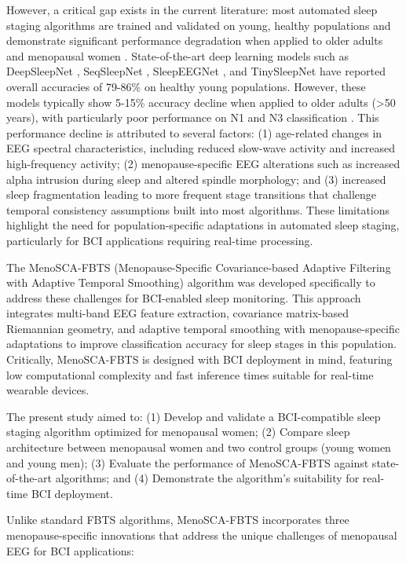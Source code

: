 \documentclass[a4paper,fleqn]{cas-dc}
\begin{document}
However, a critical gap exists in the current literature: most automated sleep staging algorithms are trained and validated on young, healthy populations and demonstrate significant performance degradation when applied to older adults and menopausal women \cite{Phan2021}. State-of-the-art deep learning models such as DeepSleepNet \cite{Supratak2017}, SeqSleepNet \cite{Phan2019}, SleepEEGNet \cite{Supratak2018}, and TinySleepNet \cite{Perslev2021} have reported overall accuracies of 79-86\% on healthy young populations. However, these models typically show 5-15\% accuracy decline when applied to older adults (\textgreater{}50 years), with particularly poor performance on N1 and N3 classification \cite{Chambon2018, Eldele2021}. This performance decline is attributed to several factors: (1) age-related changes in EEG spectral characteristics, including reduced slow-wave activity and increased high-frequency activity; (2) menopause-specific EEG alterations such as increased alpha intrusion during sleep and altered spindle morphology; and (3) increased sleep fragmentation leading to more frequent stage transitions that challenge temporal consistency assumptions built into most algorithms. These limitations highlight the need for population-specific adaptations in automated sleep staging, particularly for BCI applications requiring real-time processing.

The MenoSCA-FBTS (Menopause-Specific Covariance-based Adaptive Filtering with Adaptive Temporal Smoothing) algorithm was developed specifically to address these challenges for BCI-enabled sleep monitoring. This approach integrates multi-band EEG feature extraction, covariance matrix-based Riemannian geometry, and adaptive temporal smoothing with menopause-specific adaptations to improve classification accuracy for sleep stages in this population. Critically, MenoSCA-FBTS is designed with BCI deployment in mind, featuring low computational complexity and fast inference times suitable for real-time wearable devices.

The present study aimed to: (1) Develop and validate a BCI-compatible sleep staging algorithm optimized for menopausal women; (2) Compare sleep architecture between menopausal women and two control groups (young women and young men); (3) Evaluate the performance of MenoSCA-FBTS against state-of-the-art algorithms; and (4) Demonstrate the algorithm's suitability for real-time BCI deployment.

Unlike standard FBTS algorithms, MenoSCA-FBTS incorporates three menopause-specific innovations that address the unique challenges of menopausal EEG for BCI applications:
\end{document}
